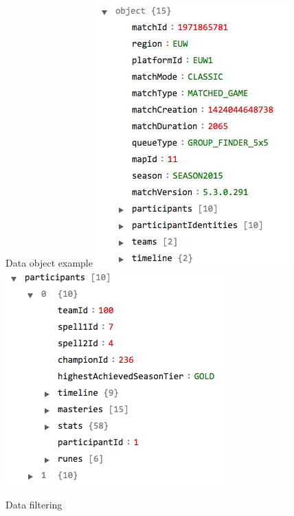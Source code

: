 \begin{frame}{Data object example}
\includegraphics[scale=0.5]{leagueoflegends/gameobject}
\includegraphics[scale=0.5]{leagueoflegends/participant}
\end{frame}
\begin{frame}{Data filtering}
\end{frame}